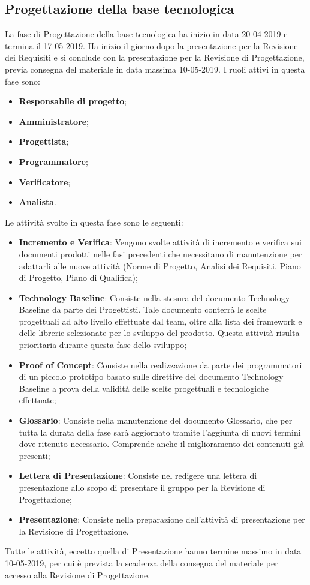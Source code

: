 \subsection{Progettazione della base tecnologica}
La fase di Progettazione della base tecnologica ha inizio in data 20-04-2019 e termina il 17-05-2019. Ha inizio il giorno dopo la presentazione per la Revisione dei Requisiti e si conclude con la presentazione per la Revisione di Progettazione, previa consegna del materiale in data massima 10-05-2019.
I ruoli attivi in questa fase sono:
\begin{itemize}
    \item \textbf{Responsabile di progetto};
    \item \textbf{Amministratore};
    \item \textbf{Progettista};
    \item \textbf{Programmatore};
    \item \textbf{Verificatore};
    \item\textbf{Analista}.
\end{itemize}
Le attività svolte in questa fase sono le seguenti:
\begin{itemize}
    \item \textbf{Incremento e Verifica}: Vengono svolte attività di incremento e verifica sui documenti prodotti nelle fasi precedenti che necessitano di manutenzione per adattarli alle nuove attività (Norme di Progetto, Analisi dei Requisiti, Piano di Progetto, Piano di Qualifica);
    \item \textbf{Technology Baseline}: Consiste nella stesura del documento Technology Baseline da parte dei Progettisti. Tale documento conterrà le scelte progettuali ad alto livello effettuate dal team, oltre alla lista dei framework e delle librerie selezionate per lo sviluppo del prodotto. Questa attività risulta prioritaria durante questa fase dello sviluppo;
    \item \textbf{Proof of Concept}: Consiste nella realizzazione da parte dei programmatori di un piccolo prototipo basato sulle direttive del documento Technology Baseline a prova della validità delle scelte progettuali e tecnologiche effettuate;
    \item \textbf{Glossario}: Consiste nella manutenzione del documento Glossario, che per tutta la durata della fase sarà aggiornato tramite l'aggiunta di nuovi termini dove ritenuto necessario. Comprende anche il miglioramento dei contenuti già presenti;
    \item \textbf{Lettera di Presentazione}: Consiste nel redigere una lettera di presentazione allo scopo di presentare il gruppo per la Revisione di Progettazione;
    \item \textbf{Presentazione}: Consiste nella preparazione dell'attività di presentazione per la Revisione di Progettazione.
\end{itemize}
Tutte le attività, eccetto quella di Presentazione hanno termine massimo in data 10-05-2019, per cui è prevista la scadenza della consegna del materiale per accesso alla Revisione di Progettazione.
